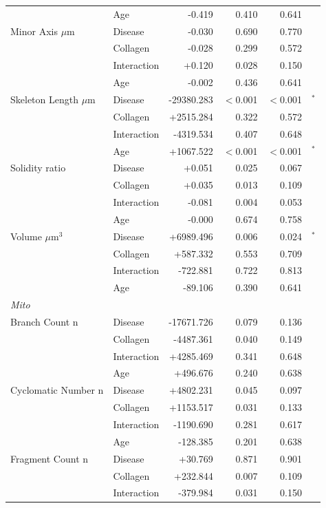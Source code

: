 \documentclass[11pt,a4paper]{article}
\begin{document}
\begin{longtable}{llrrrr}
   & Age & -0.419 & 0.410 & 0.641 &  \\
  Minor Axis $\mu$m & Disease & -0.030 & 0.690 & 0.770 &  \\
   & Collagen & -0.028 & 0.299 & 0.572 &  \\
   & Interaction & +0.120 & 0.028 & 0.150 &  \\
   & Age & -0.002 & 0.436 & 0.641 &  \\
  Skeleton Length $\mu$m & Disease & -29380.283 & $<$0.001 & $<$0.001 & $^{*}$ \\
   & Collagen & +2515.284 & 0.322 & 0.572 &  \\
   & Interaction & -4319.534 & 0.407 & 0.648 &  \\
   & Age & +1067.522 & $<$0.001 & $<$0.001 & $^{*}$ \\
  Solidity ratio & Disease & +0.051 & 0.025 & 0.067 &  \\
   & Collagen & +0.035 & 0.013 & 0.109 &  \\
   & Interaction & -0.081 & 0.004 & 0.053 &  \\
   & Age & -0.000 & 0.674 & 0.758 &  \\
  Volume $\mu$m$^{3}$ & Disease & +6989.496 & 0.006 & 0.024 & $^{*}$ \\
   & Collagen & +587.332 & 0.553 & 0.709 &  \\
   & Interaction & -722.881 & 0.722 & 0.813 &  \\
   & Age & -89.106 & 0.390 & 0.641 &  \\
\midrule
\multicolumn{6}{l}{\textit{Mito}} \\
  Branch Count n & Disease & -17671.726 & 0.079 & 0.136 &  \\
   & Collagen & -4487.361 & 0.040 & 0.149 &  \\
   & Interaction & +4285.469 & 0.341 & 0.648 &  \\
   & Age & +496.676 & 0.240 & 0.638 &  \\
  Cyclomatic Number n & Disease & +4802.231 & 0.045 & 0.097 &  \\
   & Collagen & +1153.517 & 0.031 & 0.133 &  \\
   & Interaction & -1190.690 & 0.281 & 0.617 &  \\
   & Age & -128.385 & 0.201 & 0.638 &  \\
  Fragment Count n & Disease & +30.769 & 0.871 & 0.901 &  \\
   & Collagen & +232.844 & 0.007 & 0.109 &  \\
   & Interaction & -379.984 & 0.031 & 0.150 &  \\

\end{longtable}
\end{document}
